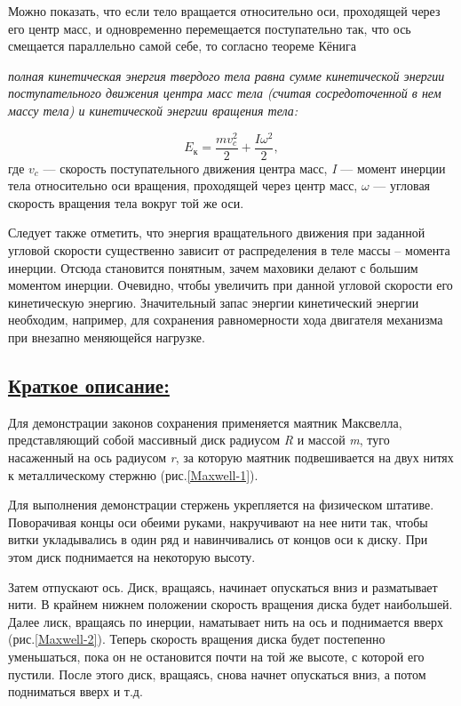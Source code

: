 \documentclass[14pt,a4paper,oneside]{extarticle}	%
\begin{document}
Можно показать, что если тело вращается относительно оси, проходящей через его центр масс, и одновременно перемещается поступательно так, что ось смещается параллельно самой себе, то согласно теореме Кёнига
\begin{flushleft}
\textit{полная кинетическая энергия твердого тела равна сумме кинетической энергии поступательного движения центра масс тела (считая сосредоточенной в нем массу тела) и кинетической энергии вращения тела:}
\end{flushleft}
$$ E_\text{к} = \frac{mv_c^2}{2} + \frac{I\omega^2}{2}, $$
где $ v_c $ — скорость поступательного движения центра масс, \textit{I} — момент инерции тела относительно оси вращения, проходящей через центр масс, $ \omega $ — угловая скорость вращения тела вокруг той же оси.

Следует также отметить, что энергия вращательного движения при заданной угловой скорости существенно зависит от распределения в теле массы – момента инерции.
Отсюда становится понятным, зачем маховики делают с большим моментом инерции.
Очевидно, чтобы увеличить при данной угловой скорости его кинетическую энергию.
Значительный запас энергии кинетический энергии необходим, например, для сохранения равномерности хода двигателя механизма при внезапно меняющейся нагрузке.
	
\subsection*{\underline{Краткое описание:}}


Для демонстрации законов сохранения применяется маятник Максвелла, представляющий собой массивный диск радиусом \textit{R} и массой \textit{m}, туго насаженный на ось радиусом \textit{r}, за которую маятник подвешивается на двух нитях к металлическому стержню (рис.\ref{Maxwell-1}).

Для выполнения демонстрации стержень укрепляется на физическом штативе.
Поворачивая концы оси обеими руками, накручивают на нее нити так, чтобы витки укладывались в один ряд и навинчивались от концов оси к диску.
При этом диск поднимается на некоторую высоту.

Затем отпускают ось.
Диск, вращаясь, начинает опускаться вниз и разматывает нити.
В крайнем нижнем положении скорость вращения диска будет наибольшей.
Далее лиск, вращаясь по инерции, наматывает нить на ось и поднимается вверх (рис.\ref{Maxwell-2}).
Теперь скорость вращения диска будет постепенно уменьшаться, пока он не остановится почти на той же высоте, с которой его пустили.
После этого диск, вращаясь, снова начнет опускаться вниз, а потом подниматься вверх и т.д.
\end{document}
